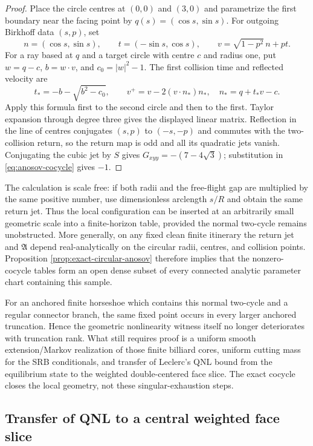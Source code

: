 \documentclass[11pt]{article}
\begin{document}
\begin{proof}
Place the circle centres at $(0,0)$ and $(3,0)$ and parametrize the first
boundary near the facing point by $q(s)=(\cos s,\sin s)$.  For outgoing
Birkhoff data $(s,p)$, set
\[
 n=(\cos s,\sin s),\qquad t=(-\sin s,\cos s),\qquad
 v=\sqrt{1-p^2}\,n+pt.
\]
For a ray based at $q$ and a target circle with centre $c$ and radius one,
put $w=q-c$, $b=w\cdot v$, and $c_0=|w|^2-1$.  The first collision time and
reflected velocity are
\[
 t_*=-b-\sqrt{b^2-c_0},\qquad
 v^+=v-2(v\cdot n_*)n_*,
 \quad n_*=q+t_*v-c.
\]
Apply this formula first to the second circle and then to the first.  Taylor
expansion through degree three gives the displayed linear matrix.  Reflection
in the line of centres conjugates $(s,p)$ to $(-s,-p)$ and commutes with the
two-collision return, so the return map is odd and all its quadratic jets
vanish.  Conjugating the cubic jet by $S$ gives
$G_{xyy}=-(7-4\sqrt3)$; substitution in
\eqref{eq:anosov-cocycle} gives $-1$.
\end{proof}

The calculation is scale free: if both radii and the free-flight gap are
multiplied by the same positive number, use dimensionless arclength $s/R$ and
obtain the same return jet.  Thus the local configuration can be inserted at
an arbitrarily small geometric scale into a finite-horizon table, provided
the normal two-cycle remains unobstructed.  More generally, on any fixed clean
finite itinerary the return jet and $\mathfrak A$ depend real-analytically on
the circular radii, centres, and collision points.  Proposition
\ref{prop:exact-circular-anosov} therefore implies that the nonzero-cocycle
tables form an open dense subset of every connected analytic parameter chart
containing this sample.

For an anchored finite horseshoe which contains this normal two-cycle and a
regular connector branch, the same fixed point occurs in every larger
anchored truncation.  Hence the geometric nonlinearity witness itself no
longer deteriorates with truncation rank.  What still requires proof is a
uniform smooth extension/Markov realization of those finite billiard cores,
uniform cutting mass for the SRB conditionals, and transfer of Leclerc's QNL
bound from the equilibrium state to the weighted double-centered face slice.
The exact cocycle closes the local geometry, not these singular-exhaustion
steps.

\subsection{Transfer of QNL to a central weighted face slice}
\end{document}
